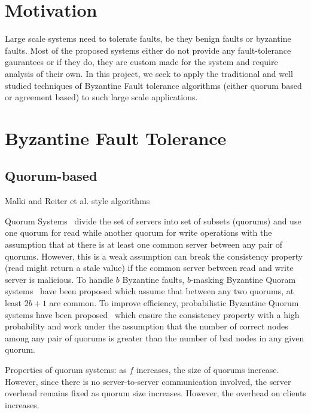 \section{Motivation} 
Large scale systems need to tolerate faults, be they benign faults or byzantine faults. Most of the proposed systems either do not provide any fault-tolerance gaurantees or if they do, they are custom made for the system and require analysis of their own. In this project, we seek to apply the traditional and well studied techniques of Byzantine Fault tolerance algorithms (either quorum based or agreement based) to such large scale applications.  
 
\section{Byzantine Fault Tolerance} 
 
\subsection{Quorum-based} 
Malki and Reiter et al. style algorithms 
 
Quorum Systems~\cite{} divide the set of servers into set of subsets (quorums) and use one quorum for read while another quorum for write operations with the assumption that at there is at least one common server between any pair of quorums. However, this is a weak assumption can break the consistency property (read might return a stale value) if the common server between read and write server is malicious. To handle $b$ Byzantine faults, $b$-masking Byzantine Quoram systems~\cite{} have been proposed which assume that between any two quorums, at least $2b+1$ are common. To improve efficiency, probabilistic Byzantine Quorum systems have been proposed~\cite{} which ensure the consistency property with a high probability and work under the assumption that the number of correct nodes among any pair of quorums is greater than the number of bad nodes in any given quorum. 
 
Properties of quorum systems: as $f$ increases, the size of quorums increase. However, since there is no server-to-server communication involved, the server overhead remains fixed as quorum size increases. However, the overhead on clients increases. 
 
